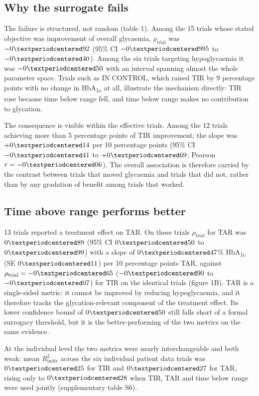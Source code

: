 \documentclass[11pt,a4paper]{article}
\newcommand{\pp}{percentage points}
\begin{document}
\subsection{Why the surrogate fails}
The failure is structured, not random (table 1). Among the 15 trials whose stated objective was improvement
of overall glycaemia, $\rho_{\mathrm{trial}}$ was $-0\textperiodcentered92$ (95\% CI
$-0\textperiodcentered995$ to $-0\textperiodcentered40$). Among the six trials targeting hypoglycaemia it
was $-0\textperiodcentered50$ with an interval spanning almost the whole parameter space. Trials such as
IN CONTROL,\citep{vanbeers2016} which raised TIR by 9 \pp{} with no change in
HbA\textsubscript{1c} at all,
illustrate the mechanism directly: TIR rose because time below range fell, and time below range makes no
contribution to glycation.

The consequence is visible within the effective trials. Among the 12 trials achieving more than 5 \pp{} of
TIR improvement, the slope was $+0\textperiodcentered14$ per 10 \pp{} (95\% CI $-0\textperiodcentered41$ to
$+0\textperiodcentered69$; Pearson $r = -0\textperiodcentered06$). The overall association is therefore
carried by the contrast between trials that moved glycaemia and trials that did not, rather than by any
gradation of benefit among trials that worked.

\subsection{Time above range performs better}
13 trials reported a treatment effect on TAR. On these trials $\rho_{\mathrm{trial}}$ for TAR was
$0\textperiodcentered89$ (95\% CI $0\textperiodcentered50$ to $0\textperiodcentered99$) with a slope of
$0\textperiodcentered47$\% HbA\textsubscript{1c} (SE $0\textperiodcentered11$) per 10 \pp{} TAR, against
$\rho_{\mathrm{trial}} = -0\textperiodcentered65$ ($-0\textperiodcentered90$ to $-0\textperiodcentered07$)
for TIR on the identical trials (figure 1B). TAR is a single-sided metric: it cannot be improved by reducing
hypoglycaemia, and it therefore tracks the glycation-relevant component of the treatment effect. Its lower
confidence bound of $0\textperiodcentered50$ still falls short of a formal surrogacy threshold, but it is the
better-performing of the two metrics on the same evidence.

At the individual level the two metrics were nearly interchangeable and both weak: mean
$R^2_{\mathrm{indiv}}$ across the six individual patient data trials was $0\textperiodcentered25$ for TIR and
$0\textperiodcentered27$ for TAR, rising only to $0\textperiodcentered28$ when TIR, TAR and time below range
were used jointly (supplementary table S6).
\end{document}
